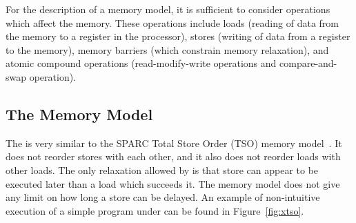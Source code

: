 For the description of a memory model, it is sufficient to consider operations which affect the memory.
These operations include loads (reading of data from the memory to a register in the processor), stores (writing of data from a register to the memory), memory barriers (which constrain memory relaxation), and atomic compound operations (read-modify-write operations and compare-and-swap operation).

\subsection{The \xtso Memory Model}

The \xtso is very similar to the SPARC Total Store Order (TSO) memory model~\cite{SPARC94}.
It does not reorder stores with each other, and it also does not reorder loads with other loads.
The only relaxation allowed by \xtso is that store can appear to be executed later than a load which succeeds it.
The memory model does not give any limit on how long a store can be delayed.
An example of non-intuitive execution of a simple program under \xtso can be found in Figure~\ref{fig:xtso}.

